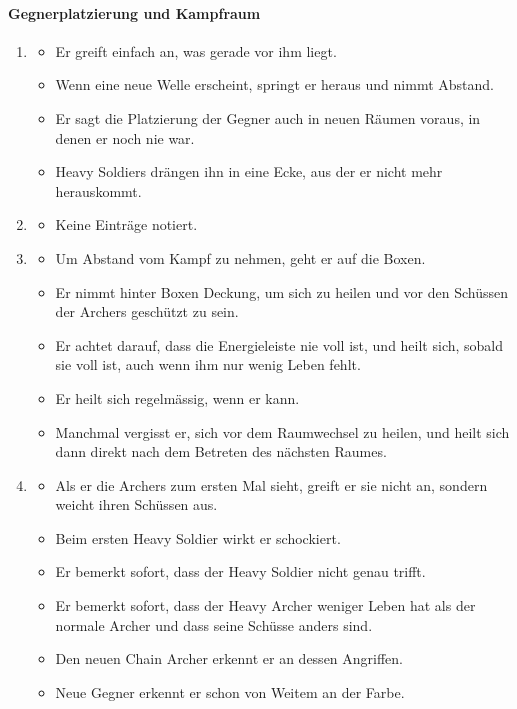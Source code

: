 \documentclass[../Main.tex]{subfiles}
\begin{document}
\paragraph{Gegnerplatzierung und Kampfraum}
\begin{enumerate}[label=\textbf{B\arabic*}, leftmargin=1.5cm, itemsep=0.8em, resume]
    \item
        \begin{itemize}[nosep]
            \item Er greift einfach an, was gerade vor ihm liegt.
            \item Wenn eine neue Welle erscheint, springt er heraus und nimmt Abstand.
            \item Er sagt die Platzierung der Gegner auch in neuen Räumen voraus, in denen er noch nie war.
            \item Heavy Soldiers drängen ihn in eine Ecke, aus der er nicht mehr herauskommt.
        \end{itemize}
    \item
        \begin{itemize}[nosep]
            \item Keine Einträge notiert.
        \end{itemize}
    \item
        \begin{itemize}[nosep]
            \item Um Abstand vom Kampf zu nehmen, geht er auf die Boxen.
            \item Er nimmt hinter Boxen Deckung, um sich zu heilen und vor den Schüssen der Archers geschützt zu sein.
            \item Er achtet darauf, dass die Energieleiste nie voll ist, und heilt sich, sobald sie voll ist, auch wenn ihm nur wenig Leben fehlt.
            \item Er heilt sich regelmässig, wenn er kann.
            \item Manchmal vergisst er, sich vor dem Raumwechsel zu heilen, und heilt sich dann direkt nach dem Betreten des nächsten Raumes.
        \end{itemize}
    \item
        \begin{itemize}[nosep]
            \item Als er die Archers zum ersten Mal sieht, greift er sie nicht an, sondern weicht ihren Schüssen aus.
            \item Beim ersten Heavy Soldier wirkt er schockiert.
            \item Er bemerkt sofort, dass der Heavy Soldier nicht genau trifft.
            \item Er bemerkt sofort, dass der Heavy Archer weniger Leben hat als der normale Archer und dass seine Schüsse anders sind.
            \item Den neuen Chain Archer erkennt er an dessen Angriffen.
            \item Neue Gegner erkennt er schon von Weitem an der Farbe.
        \end{itemize}
\end{enumerate}
\end{document}
